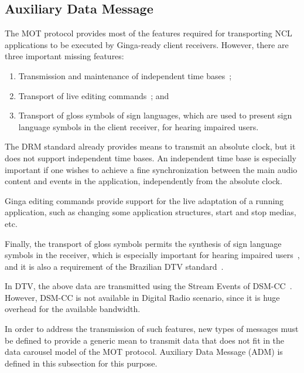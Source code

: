 \documentclass[11pt]{article}
\begin{document}
\pagebreak
\begin{appendices}

\section{Auxiliary Data Message}
\label{sec:annex}

The MOT protocol provides most of the features required for transporting NCL
applications to be executed by Ginga-ready client receivers.
However, there are three important missing features:
\begin{enumerate}
  \item Transmission and maintenance of independent time
        bases~\cite{Moreno-M-F-2015};
  \item Transport of live editing commands~\cite{soares_nested_2006}; and
  \item Transport of gloss symbols of sign languages, which are used to present
        sign language symbols in the client receiver, for hearing impaired
        users.
\end{enumerate}

The DRM standard already provides means to transmit an absolute clock, but
it does not support independent time bases.
An independent time base is especially important if one wishes to achieve a
fine synchronization between the main audio content and events in the
application, independently from the absolute clock.

Ginga editing commands provide support for the live adaptation of a running
application, such as changing some application structures, start and stop
medias, etc.

Finally, the transport of gloss symbols permits the synthesis of sign
language symbols in the receiver, which is especially important for hearing
impaired users~\cite{araujo_automatic_2012}, and it is also a requirement of
the Brazilian DTV standard~\cite{ABNT-15610-3-2016}.

In DTV, the above data are transmitted using the Stream Events of
DSM-CC~\cite{ISO-13818-6-1998}. However, DSM-CC is not available in Digital
Radio scenario, since it is huge overhead for the available
bandwidth.

In order to address the transmission of such features, new types of messages
must be defined to provide a generic mean to transmit data that
does not fit in the data carousel model of the MOT protocol. Auxiliary Data
Message (ADM) is defined in this subsection for this purpose.


\end{appendices}
\end{document}
